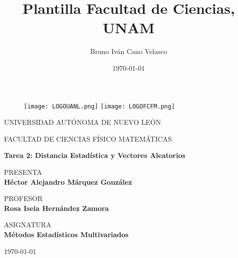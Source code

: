 \documentclass{article}
\title{Plantilla Facultad de Ciencias, UNAM}
\author{Bruno Iván Cano Velasco}
\date{\today}
\begin{document}
\thispagestyle{empty}
	
	\begin{figure}[ht]
			\texttt{[image: LOGOUANL.png]}
			\label{EscudoUNAM}
	   \endminipage
			\texttt{[image: LOGOFCFM.png]}
			\label{EscudoFC}
		\endminipage
	\end{figure}
	
	\begin{center}
	\vspace{0.8cm}
	\LARGE
	UNIVERSIDAD AUTÓNOMA DE NUEVO LEÓN
	
	\vspace{0.8cm}
	\LARGE
	FACULTAD DE CIENCIAS FÍSICO MATEMÁTICAS
	
	\vspace{1.7cm}	
	\Large
	\textbf{Tarea 2: Distancia Estadística y Vectores Aleatorios}

	\vspace{1.3cm}
	\normalsize	
	PRESENTA \\
	\vspace{.3cm}
	\large
	\textbf{Héctor Alejandro Márquez González}
	
	\vspace{1.3cm}
	\normalsize	
	PROFESOR \\
	\vspace{.3cm}
	\large
	\textbf{Rosa Isela Hernández Zamora}
	
	\vspace{1.3cm}
	\normalsize	
	ASIGNATURA \\
	\vspace{.3cm}
	\large
	\textbf{Métodos Estadísticos Multivariados}
	
	\vspace{1.3cm}
	\today
	\end{center}
	
	\newpage
	
\end{document}
